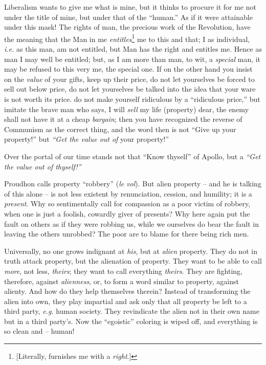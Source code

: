 \documentclass[12pt,a4paper]{book}
\begin{document}
Liberalism wants to give me what is mine, but it thinks to procure it for me 
not under the title of mine, but under that of the ``human.'' As if it were 
attainable under this mask! The rights of man, the precious work of the 
Revolution, have the meaning that the Man in me 
\textit{entitles}\footnote{[Literally, furnishes me with a \textit{right}.]} 
me to this and that; I as individual, \textit{i.e.} as this man, am not 
entitled, but Man has the right and entitles me. Hence as man I may well be 
entitled; but, as I am more than man, to wit, a \textit{special} man, it may 
be refused to this very me, the special one. If on the other hand you insist 
on the \textit{value} of your gifts, keep up their price, do not let 
yourselves be forced to sell out below price, do not let yourselves be talked 
into the idea that your ware is not worth its price. do not make yourself 
ridiculous by a ``ridiculous price,'' but imitate the brave man who says, I 
will \textit{sell} my life (property) dear, the enemy shall not have it at a 
cheap \textit{bargain}; then you have recognized the reverse of Communism as 
the correct thing, and the word then is not ``Give up your property!'' but 
\textit{``Get the value out of} your property!''

Over the portal of our time stands not that ``Know thyself'' of Apollo, but 
a \textit{``Get the value out of thyself!''}

Proudhon calls property ``robbery'' (\textit{le vol}). But alien property -- 
and he is talking of this alone -- is not less existent by renunciation, 
cession, and humility; it is a \textit{present}. Why so sentimentally call for 
compassion as a poor victim of robbery, when one is just a foolish, cowardly 
giver of presents? Why here again put the fault on others as if they were 
robbing us, while we ourselves do bear the fault in leaving the others 
unrobbed? The poor are to blame for there being rich men.

Universally, no one grows indignant at \textit{his}, but at \textit{alien} 
property. They do not in truth attack property, but the alienation of 
property. They want to be able to call \textit{more}, not less, 
\textit{theirs}; they want to call everything \textit{theirs}. They are 
fighting, therefore, against \textit{alienness}, or, to form a word similar to 
property, against alienty. And how do they help themselves therein? Instead of 
transforming the alien into own, they play impartial and ask only that all 
property be left to a third party, \textit{e.g.} human society. They 
revindicate the alien not in their own name but in a third party's. Now the 
``egoistic'' coloring is wiped off, and everything is so clean and -- human!
\end{document}
